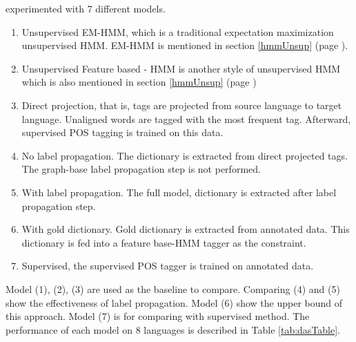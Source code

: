  experimented with 7 different models. 
\begin{enumerate}
\item Unsupervised EM-HMM, which is a traditional expectation maximization unsupervised HMM. EM-HMM is mentioned in section \ref{hmmUnsup} (page \pageref{hmmUnsup}). 

\item Unsupervised Feature based - HMM is another style of unsupervised HMM which is also mentioned in section \ref{hmmUnsup} (page \pageref{hmmUnsup})

\item Direct projection, that is, tags are projected from source language to target language. Unaligned words are tagged with the most frequent tag. Afterward, supervised POS tagging is trained on this data.

\item No label propagation. The dictionary is extracted from direct projected tags. The graph-base label propagation step is not performed. 

\item With label propagation. The full model, dictionary is extracted after label propagation step. 

\item With gold dictionary. Gold dictionary is extracted from annotated data. This dictionary is fed into a feature base-HMM tagger as the constraint. 

\item Supervised, the supervised POS tagger is trained on annotated data.
\end{enumerate}
Model (1), (2), (3) are used as the baseline to compare. Comparing (4) and (5) show the effectiveness of label propagation. Model (6) show the upper bound of this approach. Model (7) is for comparing with supervised method. The performance of each model on 8 languages is described in Table \ref{tab:dasTable}. 


